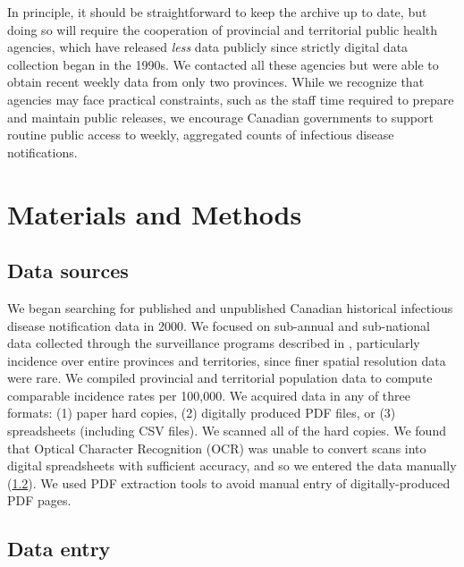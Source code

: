 \documentclass[12pt]{article}
\begin{document}
In principle, it should be straightforward to keep the archive up to date, but doing so will require the cooperation of provincial and territorial public health agencies, which have released \emph{less} data publicly since strictly digital data collection began in the 1990s. We contacted all these agencies but were able to obtain recent weekly data from only two provinces. While we recognize that agencies may face practical constraints, such as the staff time required to prepare and maintain public releases, we encourage Canadian governments to support routine public access to weekly, aggregated counts of infectious disease notifications.

\section{Materials and Methods}\label{sec:methods}

\subsection{Data sources}\label{sec:data-sources}

We began searching for published and unpublished Canadian historical infectious disease notification data in 2000. We focused on sub-annual and sub-national data collected through the surveillance programs described in , particularly incidence over entire provinces and territories, since finer spatial resolution data were rare. We compiled provincial and territorial population data \cite{canada1925sixth,statistics1973population,statcan2021population} to compute comparable incidence rates per 100,000. We acquired data in any of three formats: (1) paper hard copies, (2) digitally produced PDF files, or (3) spreadsheets (including CSV files). We scanned all of the hard copies. We found that Optical Character Recognition (OCR) was unable to convert scans into digital spreadsheets with sufficient accuracy, and so we entered the data manually (\cref{sec:data-entry}). We used PDF extraction tools \cite{PDFTables} to avoid manual entry of digitally-produced PDF pages.

\subsection{Data entry}\label{sec:data-entry}
\end{document}
